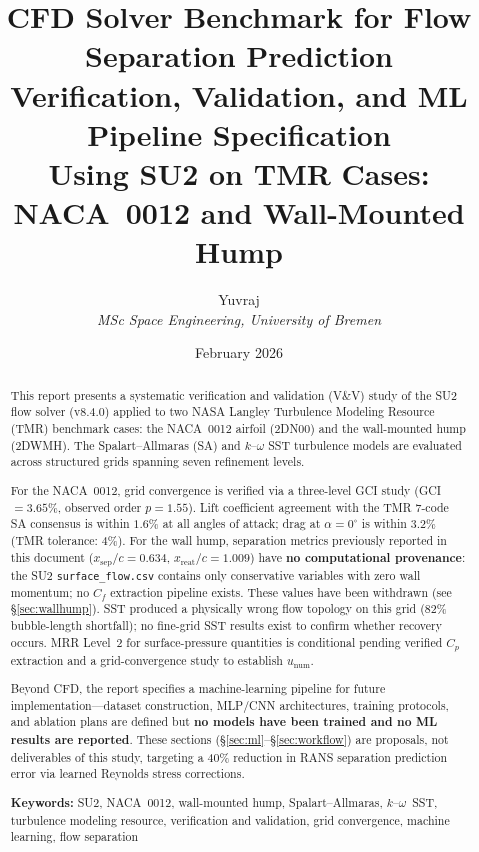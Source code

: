 \documentclass[11pt,a4paper]{article}
\title{%
  \textbf{CFD Solver Benchmark for Flow Separation Prediction}\\[6pt]
  \large Verification, Validation, and ML Pipeline Specification\\[4pt]
  \normalsize Using SU2 on TMR Cases: NACA~0012 and Wall-Mounted Hump
}
\author{
  Yuvraj\\
  \textit{MSc Space Engineering, University of Bremen}
}
\date{February 2026}
\begin{document}

\maketitle

\begin{abstract}
This report presents a systematic verification and validation (V\&V) study of the
SU2 flow solver (v8.4.0) applied to two NASA Langley Turbulence Modeling Resource
(TMR) benchmark cases: the NACA~0012 airfoil (2DN00) and the wall-mounted hump
(2DWMH). The Spalart--Allmaras (SA) and $k$--$\omega$ SST turbulence models are
evaluated across structured grids spanning seven refinement levels.

For the NACA~0012, grid convergence is verified via a three-level GCI study (GCI
$= 3.65\%$, observed order $p = 1.55$). Lift coefficient agreement with the TMR
7-code SA consensus is within $1.6\%$ at all angles of attack; drag at
$\alpha = 0^\circ$ is within $3.2\%$ (TMR tolerance: $4\%$). For the wall hump,
separation metrics previously reported in this document
($x_\text{sep}/c = 0.634$, $x_\text{reat}/c = 1.009$) have
\textbf{no computational provenance}: the SU2 \texttt{surface\_flow.csv}
contains only conservative variables with zero wall momentum; no
$C_f$ extraction pipeline exists. These values have been withdrawn
(see \S\ref{sec:wallhump}). SST produced a physically wrong flow topology
on this grid (82\% bubble-length shortfall); no fine-grid SST results
exist to confirm whether recovery occurs. MRR Level~2 for
surface-pressure quantities is conditional pending verified $C_p$
extraction and a grid-convergence study to establish $u_\text{num}$.

Beyond CFD, the report specifies a machine-learning pipeline for
future implementation---dataset construction, MLP/CNN architectures,
training protocols, and ablation plans are defined but
\textbf{no models have been trained and no ML results are reported}.
These sections (\S\ref{sec:ml}--\S\ref{sec:workflow}) are proposals,
not deliverables of this study, targeting a 40\% reduction in RANS separation prediction
error via learned Reynolds stress corrections.

\medskip\noindent
\textbf{Keywords:} SU2, NACA~0012, wall-mounted hump, Spalart--Allmaras,
$k$--$\omega$~SST, turbulence modeling resource, verification and validation,
grid convergence, machine learning, flow separation
\end{abstract}
\end{document}
